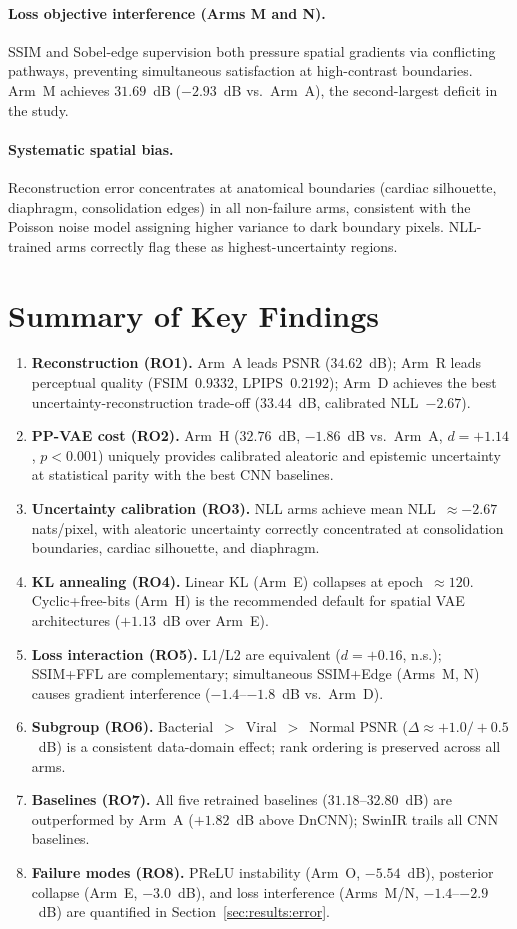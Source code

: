 \documentclass[12pt, a4paper, twoside, openright]{book}
\begin{document}
\paragraph{Loss objective interference (Arms M and N).}
SSIM and Sobel-edge supervision both pressure spatial gradients via conflicting pathways, preventing simultaneous satisfaction at high-contrast boundaries. Arm~M achieves $31.69$~dB ($-2.93$~dB vs.\ Arm~A), the second-largest deficit in the study.

\paragraph{Systematic spatial bias.}
Reconstruction error concentrates at anatomical boundaries (cardiac silhouette, diaphragm, consolidation edges) in all non-failure arms, consistent with the Poisson noise model assigning higher variance to dark boundary pixels. NLL-trained arms correctly flag these as highest-uncertainty regions.

\section{Summary of Key Findings}
\label{sec:results:summary}

\begin{enumerate}
\item \textbf{Reconstruction (RO1).} Arm~A leads PSNR ($34.62$~dB); Arm~R leads perceptual quality (FSIM~$0.9332$, LPIPS~$0.2192$); Arm~D achieves the best uncertainty-reconstruction trade-off ($33.44$~dB, calibrated NLL~$-2.67$).
\item \textbf{PP-VAE cost (RO2).} Arm~H ($32.76$~dB, $-1.86$~dB vs.\ Arm~A, $d=+1.14$, $p<0.001$) uniquely provides calibrated aleatoric and epistemic uncertainty at statistical parity with the best CNN baselines.
\item \textbf{Uncertainty calibration (RO3).} NLL arms achieve mean NLL~$\approx-2.67$ nats/pixel, with aleatoric uncertainty correctly concentrated at consolidation boundaries, cardiac silhouette, and diaphragm.
\item \textbf{KL annealing (RO4).} Linear KL (Arm~E) collapses at epoch~$\approx120$. Cyclic+free-bits (Arm~H) is the recommended default for spatial VAE architectures ($+1.13$~dB over Arm~E).
\item \textbf{Loss interaction (RO5).} L1/L2 are equivalent ($d=+0.16$, n.s.); SSIM+FFL are complementary; simultaneous SSIM+Edge (Arms~M, N) causes gradient interference ($-1.4$--$-1.8$~dB vs.\ Arm~D).
\item \textbf{Subgroup (RO6).} Bacterial~$>$~Viral~$>$~Normal PSNR ($\Delta\approx+1.0/+0.5$~dB) is a consistent data-domain effect; rank ordering is preserved across all arms.
\item \textbf{Baselines (RO7).} All five retrained baselines ($31.18$--$32.80$~dB) are outperformed by Arm~A ($+1.82$~dB above DnCNN); SwinIR trails all CNN baselines.
\item \textbf{Failure modes (RO8).} PReLU instability (Arm~O, $-5.54$~dB), posterior collapse (Arm~E, $-3.0$~dB), and loss interference (Arms~M/N, $-1.4$--$-2.9$~dB) are quantified in Section~\ref{sec:results:error}.
\end{enumerate}
\end{document}
